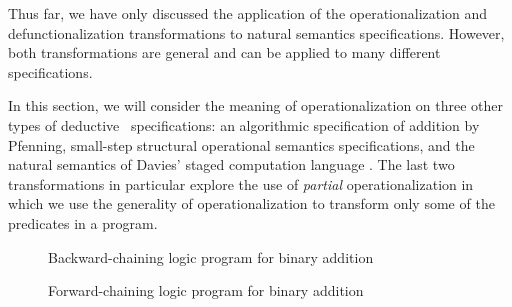Thus far, we have only discussed the application of the
operationalization and defunctionalization transformations to natural
semantics specifications. However, both transformations are general
and can be applied to many different specifications. 

In this section, we will consider the meaning of
operationalization on three other types of deductive
\sls~specifications: an algorithmic specification of addition by 
Pfenning, small-step structural operational semantics
specifications, and the natural semantics of Davies' staged computation
language \rowan. The last two transformations in particular explore 
the use of {\it partial}
operationalization in which we use the generality of operationalization
to transform only some of the predicates in a program.






\begin{figure}
\caption{Backward-chaining logic program for binary addition}
\label{fig:plus}
\end{figure}

\begin{figure}
\caption{Forward-chaining logic program for binary addition}
\label{fig:plus-1}
\end{figure}


